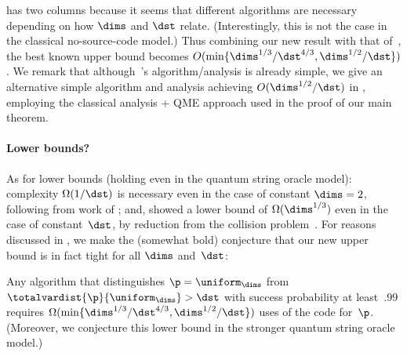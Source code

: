 \documentclass[11pt]{article}
\begin{document}
 has two columns because it seems that different algorithms are necessary depending on how $\dims$ and $\dst$ relate.
(Interestingly, this is not the case in the classical no-source-code model.)
Thus combining our new result with that of~\cite{LuoWL24}, the best known upper bound becomes $O(\min\{\dims^{1/3}/\dst^{4/3}, \dims^{1/2}/\dst\})$.
We remark that although~\cite{LuoWL24}'s algorithm/analysis is already simple, we give an alternative simple algorithm and analysis achieving $O(\dims^{1/2}/\dst)$ in , employing the classical analysis + QME approach used in the proof of our main theorem.

\paragraph{Lower bounds?} As for lower bounds (holding even in the quantum string oracle model): complexity $\Omega(1/\dst)$ is necessary even in the case of constant $\dims = 2$, following from work of \cite{NW99}; and, \cite{CFMdW10} showed a lower bound of $\Omega(\dims^{1/3})$ even in the case of constant~$\dst$, by  reduction from the collision problem~\cite{AS04}.
For reasons discussed in , we make the (somewhat bold) conjecture that our new upper bound is in fact tight for all $\dims$ and~$\dst$:
\begin{conjecture} \label{conj:tv}
    Any algorithm that distinguishes  $\p = \uniform_\dims$ from $\totalvardist{\p}{\uniform_\dims} > \dst$ with success probability at least~$.99$ requires $\Omega(\min\{\dims^{1/3}/\dst^{4/3}, \dims^{1/2}/\dst\})$ uses of the code for~$\p$. (Moreover, we conjecture this lower bound in the stronger quantum string oracle model.)
\end{conjecture}
\end{document}
